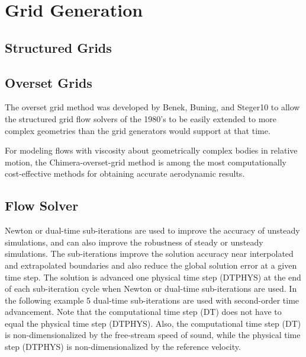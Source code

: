 \section{Grid Generation}

\subsection{Structured Grids}

\subsection{Overset Grids}

The overset grid method was developed by Benek, Buning, and Steger10 to allow the structured grid flow solvers of the 1980’s to be easily extended to more complex geometries than the grid generators would support at that time. 

For modeling flows with viscosity about geometrically complex bodies in relative motion, the Chimera-overset-grid method is among the most computationally cost-effective methods for obtaining accurate aerodynamic results.

\subsection{Flow Solver}

Newton or dual-time sub-iterations are used to improve the accuracy of unsteady simulations, and can also improve the robustness of steady or unsteady simulations.  The sub-iterations improve the solution accuracy near interpolated and extrapolated boundaries and also reduce the global solution error at a given time step.  The solution is advanced one physical time step (DTPHYS) at the end of each sub-iteration cycle when Newton or dual-time sub-iterations are used.  In the following example 5 dual-time sub-iterations are used with second-order time advancement.  Note that the computational time step (DT) does not have to equal the physical time step (DTPHYS).  Also, the computational time step (DT) is non-dimensionalized by the free-stream speed of sound, while the physical time step (DTPHYS) is non-dimensionalized by the reference velocity.